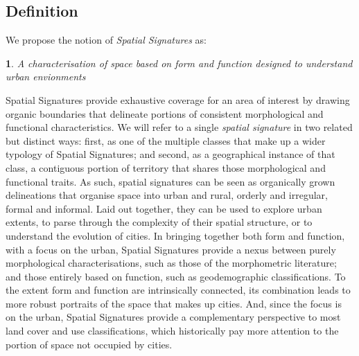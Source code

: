 \subsection{Definition}
\label{sec:ss_def}

We propose the notion of \textit{Spatial Signatures} as:

\newtheorem*{theorem}{}
\begin{theorem}
A characterisation of space based on form and function designed to understand
urban envionments
\end{theorem}

Spatial Signatures provide exhaustive coverage for an area of interest by
drawing organic boundaries that delineate portions of consistent morphological
and functional characteristics.
%
We will refer to a single \textit{spatial signature} in two related but
distinct ways: first, as one of the multiple classes that make up a wider
typology of Spatial Signatures; and second, as a geographical instance of that
class, a contiguous portion of territory that shares those morphological and
functional traits.
As such, spatial signatures can be seen as organically grown delineations that
organise space into urban and rural, orderly and irregular, formal and informal.
%
Laid out together, they can be used to explore urban extents, to parse through
the complexity of their spatial structure, or to understand the evolution of
cities.
In bringing together both form and function, with a focus on the urban,
Spatial Signatures provide a nexus between purely morphological
characterisations, such as those of the morphometric literature; and those
entirely based on function, such as geodemographic classifications.
%
To the extent form and function are intrinsically connected, its
combination leads to more robust portraits of the space that makes up cities.
And, since the focus is on the urban, Spatial Signatures provide a complementary
perspective to most land cover and use classifications, which historically
pay more attention to the portion of space not occupied by cities.

